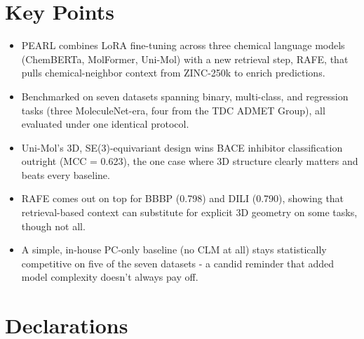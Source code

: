 \documentclass[pdflatex,sn-mathphys-num]{sn-jnl}%
\begin{document}
\section*{Key Points}
\begin{itemize}

\item PEARL combines LoRA fine-tuning across three chemical language models (ChemBERTa, MolFormer, Uni-Mol) with a new retrieval step, RAFE, that pulls chemical-neighbor context from ZINC-250k to enrich predictions.
\item Benchmarked on seven datasets spanning binary, multi-class, and regression tasks (three MoleculeNet-era, four from the TDC ADMET Group), all evaluated under one identical protocol.
\item Uni-Mol's 3D, SE(3)-equivariant design wins BACE inhibitor classification outright (MCC = 0.623), the one case where 3D structure clearly matters and beats every baseline.
\item RAFE comes out on top for BBBP (0.798) and DILI (0.790), showing that retrieval-based context can substitute for explicit 3D geometry on some tasks, though not all.
\item A simple, in-house PC-only baseline (no CLM at all) stays statistically competitive on five of the seven datasets - a candid reminder that added model complexity doesn't always pay off.

\end{itemize}
\backmatter

\section*{Declarations}
\end{document}

